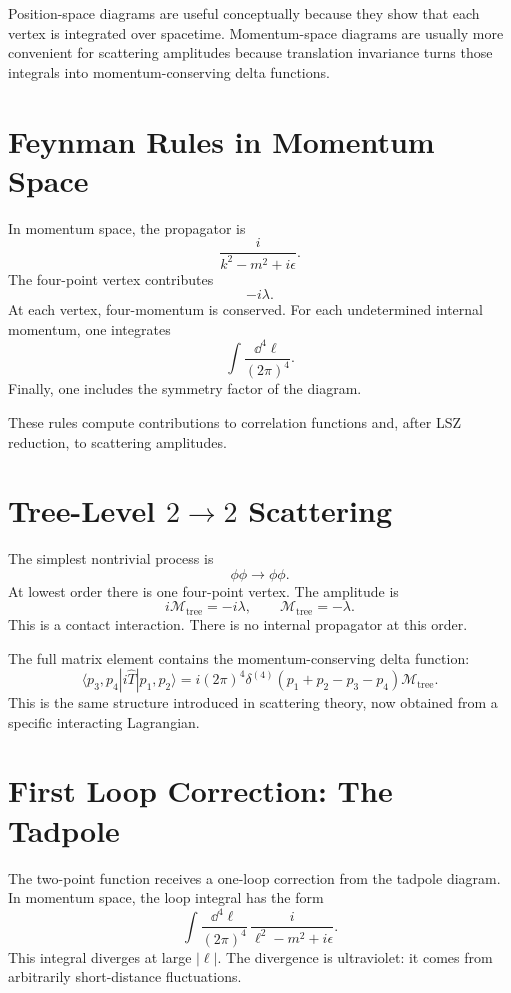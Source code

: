 Position-space diagrams are useful conceptually because they show that each
vertex is integrated over spacetime. Momentum-space diagrams are usually more
convenient for scattering amplitudes because translation invariance turns those
integrals into momentum-conserving delta functions.

\section{Feynman Rules in Momentum Space}

In momentum space, the propagator is
\[
    \frac{i}{k^2-m^2+i\epsilon}.
\]
The four-point vertex contributes
\[
    -i\lambda.
\]
At each vertex, four-momentum is conserved. For each undetermined internal
momentum, one integrates
\[
    \int\frac{\dd^4\ell}{(2\pi)^4}.
\]
Finally, one includes the symmetry factor of the diagram.

These rules compute contributions to correlation functions and, after LSZ
reduction, to scattering amplitudes.

\section{Tree-Level \texorpdfstring{\(2\to2\)}{2 to 2} Scattering}

The simplest nontrivial process is
\[
    \phi\phi\longrightarrow\phi\phi.
\]
At lowest order there is one four-point vertex. The amplitude is
\[
    i\mathcal{M}_{\mathrm{tree}}=-i\lambda,
    \qquad
    \mathcal{M}_{\mathrm{tree}}=-\lambda.
\]
This is a contact interaction. There is no internal propagator at this order.

The full matrix element contains the momentum-conserving delta function:
\[
    \langle p_3,p_4|i\hat T|p_1,p_2\rangle
    = i(2\pi)^4\delta^{(4)}(p_1+p_2-p_3-p_4)\mathcal{M}_{\mathrm{tree}}.
\]
This is the same structure introduced in scattering theory, now obtained from a
specific interacting Lagrangian.

\section{First Loop Correction: The Tadpole}

The two-point function receives a one-loop correction from the tadpole diagram.
In momentum space, the loop integral has the form
\[
    \int\frac{\dd^4\ell}{(2\pi)^4}\,
    \frac{i}{\ell^2-m^2+i\epsilon}.
\]
This integral diverges at large \(|\ell|\). The divergence is ultraviolet: it
comes from arbitrarily short-distance fluctuations.


